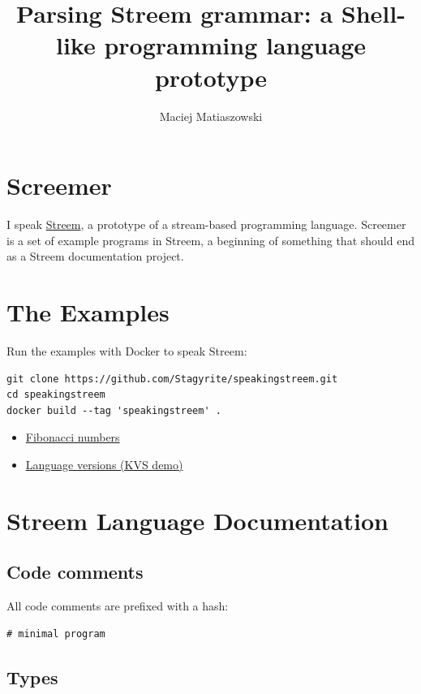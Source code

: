 \documentclass[12pt,a4paper]{article}
\title{Parsing Streem grammar: a Shell-like programming language prototype}
\author{Maciej Matiaszowski}
\date{}
\begin{document}
\maketitle

\section{Screemer}

I speak \href{https://github.com/matz/streem}{Streem}, a prototype of a stream-based programming language.  
Screemer is a set of example programs in Streem, a beginning of something that should end as a Streem documentation project. 

\section{The Examples}

Run the examples with Docker to speak Streem:

\begin{lstlisting}[style=streem]
git clone https://github.com/Stagyrite/speakingstreem.git
cd speakingstreem
docker build --tag 'speakingstreem' .
\end{lstlisting}

\begin{itemize}
\item \href{fibonacci.strm}{Fibonacci numbers}
\item \href{languageVersions.strm}{Language versions (KVS demo)}
\end{itemize}

\section{Streem Language Documentation}

\subsection{Code comments}

All code comments are prefixed with a hash:

\begin{lstlisting}[style=streem]
# minimal program
\end{lstlisting}

\subsection{Types}
\end{document}
